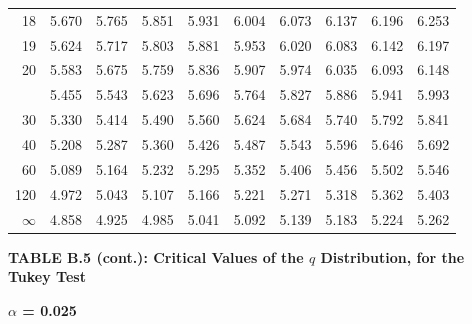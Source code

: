 \documentclass[10pt]{article}
\begin{document}
\begin{longtable}{@{}r!{\vrule width 0.8pt\hspace{0.55em}}rrrrrrrrr@{}}
18 & 5.670 & 5.765 & 5.851 & 5.931 & 6.004 & 6.073 & 6.137 & 6.196 & 6.253 \\
19 & 5.624 & 5.717 & 5.803 & 5.881 & 5.953 & 6.020 & 6.083 & 6.142 & 6.197 \\
20 & 5.583 & 5.675 & 5.759 & 5.836 & 5.907 & 5.974 & 6.035 & 6.093 & 6.148 \\
 & 5.455 & 5.543 & 5.623 & 5.696 & 5.764 & 5.827 & 5.886 & 5.941 & 5.993 \\
30 & 5.330 & 5.414 & 5.490 & 5.560 & 5.624 & 5.684 & 5.740 & 5.792 & 5.841 \\
40 & 5.208 & 5.287 & 5.360 & 5.426 & 5.487 & 5.543 & 5.596 & 5.646 & 5.692 \\
60 & 5.089 & 5.164 & 5.232 & 5.295 & 5.352 & 5.406 & 5.456 & 5.502 & 5.546 \\
120 & 4.972 & 5.043 & 5.107 & 5.166 & 5.221 & 5.271 & 5.318 & 5.362 & 5.403 \\
\addlinespace[0.30em]
$\infty$ & 4.858 & 4.925 & 4.985 & 5.041 & 5.092 & 5.139 & 5.183 & 5.224 & 5.262 \\
\end{longtable}
\newpage
\thispagestyle{empty}
\begin{center}
{\large\bfseries TABLE B.5 (cont.): Critical Values of the $q$ Distribution, for the Tukey Test\par}
\end{center}
{\large\bfseries $\alpha$ = 0.025\par}
\vspace{0.45em}
\small
\end{document}
